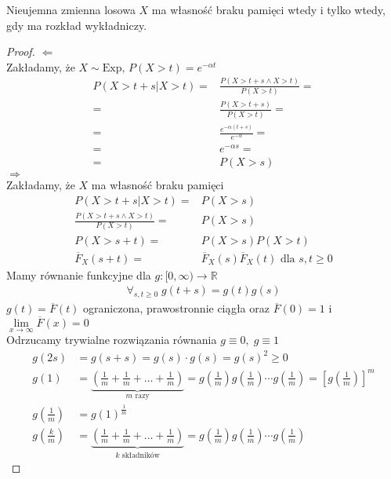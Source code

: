 \begin{twr}
Nieujemna zmienna losowa $ X $  ma własność braku pamięci wtedy i tylko wtedy, gdy ma rozkład wykładniczy.
\begin{proof}
$ \Leftarrow $\\
Zakładamy, że $ X\sim\text{Exp},\,P\left(X>t\right) =e^{-\alpha t}$
\begin{align*}
P\left(X>t+s|X>t\right)
=&
\frac{P\left(X>t+s\wedge X>t\right)}{P\left(X>t\right)}
=\\=&
\frac{P\left(X>t+s\right)}{P\left(X>t\right)}
=\\=&
\frac{e^{-\alpha(t+s)}}{e^{-\alpha}}
=\\=&
e^{-\alpha s}
=\\=&
P\left(X>s\right)
\end{align*}
$ \Rightarrow $\\
Zakładamy, że $ X $ ma własność braku pamięci
\begin{align*}
P\left(X>t+s|X>t\right)=&P\left(X>s\right)\\
\frac{P\left(X>t+s\wedge X>t\right)}{P\left(X>t\right)}
=&P\left(X>s\right)\\
P\left(X>s+t\right)=&P\left(X>s\right)P\left(X>t\right)\\
\overline{F}_X(s+t)=&\overline{F}_X(s)\overline{F}_X(t)\text{ dla }s,t\ge0
\end{align*}
Mamy równanie funkcyjne dla $ g:[0,\infty )\to \mathbb R $
\begin{gather*}
\forall_{s,t\ge0}\;g(t+s)=g(t)g(s)
\end{gather*}
$ g(t)=\overline{F}(t) $ ograniczona, prawostronnie ciągła oraz $ \overline{F}(0)=1 $ i \\
$ \lim\limits_{x\to\infty} \overline{F}(x)=0 $\\
Odrzucamy trywialne rozwiązania równania $ g\equiv0,\;g\equiv1 $
\begin{align*}
g(2s)&=g(s+s)=g(s)\cdot g(s)=g(s)^2\ge0\\
g(1)&=\underset{m\text{ razy}}{\underbrace{\left(\tfrac{1}{m}+\tfrac{1}{m}+\dots+\tfrac{1}{m}\right)}}
=
g\left(\tfrac{1}{m}\right)g\left(\tfrac{1}{m}\right)\cdots g\left(\tfrac{1}{m}\right)
=
\left[g\left(\tfrac{1}{m}\right)\right]^m\\
g\left(\tfrac{1}{m}\right)&=g(1)^{\frac{1}{m}}\\
g\left(\tfrac{k}{m}\right)
&=
\underset{k\text{ składników}}{\underbrace{\left(\tfrac{1}{m}+\tfrac{1}{m}+\dots+\tfrac{1}{m}\right)}}
=
g\left(\tfrac{1}{m}\right)g\left(\tfrac{1}{m}\right)\cdots g\left(\tfrac{1}{m}\right)

\end{align*}
\end{proof}
\end{twr}
